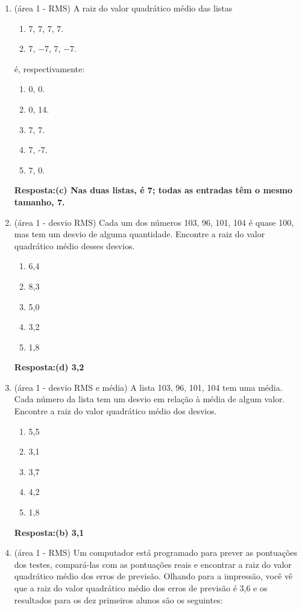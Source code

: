\documentclass[12pt]{article}\documentclass[brazilian,12pt,a4paper,final]{article}
\begin{document}
\begin{enumerate}
\item(área 1 - RMS) A raiz do valor quadrático médio das listas
    \begin{enumerate}[label=(\Roman*)]
    \item 7, 7, 7, 7.
    \item 7, −7, 7, −7.
    \end{enumerate}
é, respectivamente:
\begin{enumerate}
    \item 0, 0.
    \item 0, 14.
    \item 7, 7.
    \item 7, -7.
    \item 7, 0.
\end{enumerate}

\textbf{Resposta:(c) Nas duas listas, é 7; todas as entradas têm o mesmo tamanho, 7.}

\item (área 1 - desvio RMS) Cada um dos números 103, 96, 101, 104 é quase 100, mas tem um desvio de alguma quantidade.
Encontre a raiz do valor quadrático médio desses desvios.

\begin{enumerate}
    \item 6,4
    \item 8,3
    \item 5,0
    \item 3,2
    \item 1,8
\end{enumerate}
\textbf{Resposta:(d) 3,2}

\item (área 1 - desvio RMS e média) A lista 103, 96, 101, 104 tem uma média. Cada número da lista tem um desvio em relação à média de algum valor. Encontre a raiz do valor quadrático médio dos desvios.
\begin{enumerate}
    \item 5,5
    \item 3,1
    \item 3,7
    \item 4,2
    \item 1,8
\end{enumerate}


\textbf{Resposta:(b) 3,1}

\item (área 1 - RMS) Um computador está programado para prever as pontuações dos testes, compará-las com as pontuações reais e encontrar
a raiz do valor quadrático médio dos erros de previsão. Olhando para a impressão,
você vê que a raiz do valor quadrático médio dos erros de previsão é 3,6 e os resultados para os dez primeiros alunos
são os seguintes:


\end{enumerate}
\end{document}
